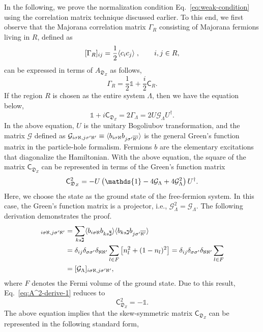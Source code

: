 In the following, we prove the normalization condition Eq.~\eqref{eq:weak-condition} using the correlation matrix technique discussed earlier. To this end, we first observe that the Majorana correlation matrix $\Gamma_R$ consisting of Majorana fermions living in $R$, defined as
\[
[\Gamma_R]_{ij} = \frac{1}{2}\langle c_ic_j \rangle\;,\qquad i,j\in R,
\]
can be expressed in terms of $A_{\mathfrak{D}_Z}$ as follows,
\[
\Gamma_R = \frac{1}{2}\mathds{1} + \frac{i}{2}\mathsf{C}_{R} .
\]
If the region $R$ is chosen as the entire system $\Lambda$, then we have the equation below,
\[
\mathds{1} + i\mathsf{C}_{\mathfrak{D}_Z}  = 2\Gamma_\Lambda = 2 U\mathcal{G}_\Lambda U^\dagger.
\]
In the above equation, $U$ is the unitary Bogoliubov transformation, and the matrix $\mathcal{G}$ defined as $\mathcal{G}_{i\sigma\aleph,j\sigma'\aleph'} 
\equiv
\langle 
b_{i\sigma\aleph} b_{j\sigma'\overline{\aleph'}}
 \rangle$ is the general Green's function matrix in the particle-hole formalism. Fermions $b$ are the elementary excitations that diagonalize the Hamiltonian. With the above equation, the square of the matrix $\mathsf{C}_{\mathfrak{D}_Z}$ can be represented in terms of the Green's function matrix
\begin{equation}\label{eq:A^2-derive-1}
    \mathsf{C}_{\mathfrak{D}_Z}^2 = -U\lr{\mathds{1} - 4\mathcal{G}_\Lambda + 4\mathcal{G}_\Lambda^2} U^\dagger.
\end{equation}
Here, we choose the state as the ground state of the free-fermion system. In this case, the Green's function matrix is a projector, i.e., $\mathcal{G}_\Lambda^2 = \mathcal{G}_\Lambda$. The following derivation demonstrates the proof.
\begin{align*}
    [\mathcal{G}_\Lambda^2]_{i\sigma\aleph,j\sigma'\aleph'} 
    &= 
    \sum_{ks\gimel}
    \anglelr{  b_{i\sigma\aleph}b_{ks\overline{\gimel}} }
    \anglelr{  b_{ks\gimel}b_{j\sigma'\overline{\aleph'}} } \\
    &=
    \delta_{ij}\delta_{\sigma\sigma'}\delta_{\aleph\aleph'}
    \sum_{l \in F}\lrm{n_l^2 +  (1-n_l)^2} 
    = \delta_{ij}\delta_{\sigma\sigma'}\delta_{\aleph\aleph'}
    \sum_{l\in F} \\
    &= [\mathcal{G}_\Lambda]_{i\sigma\aleph,j\sigma'\aleph'} ,
\end{align*}
where $F$ denotes the Fermi volume of the ground state. Due to this result, Eq.~\eqref{eq:A^2-derive-1} reduces to
\[
\mathsf{C}_{\mathfrak{D}_Z}^2 = -\mathds{1}.
\]
The above equation implies that the skew-symmetric matrix $\mathsf{C}_{\mathfrak{D}_Z}$ can be represented in the following standard form,
